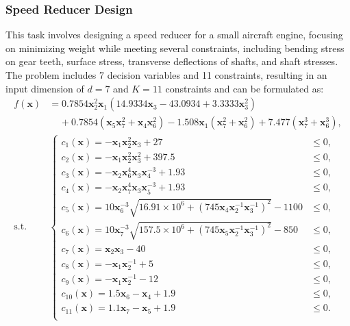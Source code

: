     
 \subsubsection{Speed Reducer Design}
\label{section:neural-cbo_speed}
This task involves designing a speed reducer for a small aircraft engine, focusing on minimizing weight while meeting several constraints, including bending stress on gear teeth, surface stress, transverse deflections of shafts, and shaft stresses. The problem includes 7 decision variables and 11 constraints, resulting in an input dimension of $d=7$ and $K=11$ constraints and can be formulated as:
\begin{align*}
    f(\mathbf{x}) &= 0.7854\mathbf{x}_2
^2 \mathbf{x}_1(14.9334\mathbf{x}_3 - 43.0934 + 3.3333\mathbf{x}_3^2) 
\\
    & \;\;\;\; +0.7854(\mathbf{x}_5\mathbf{x}_7^2 + \mathbf{x}_4\mathbf{x}_6^2) - 1.508\mathbf{x}_1(\mathbf{x}_7^2 + \mathbf{x}_6^2) + 7.477(\mathbf{x}_7^3 + \mathbf{x}_6^3), 
    \\
    \text{s.t. } & \begin{cases} 
    c_1(\mathbf{x}) = -\mathbf{x}_1\mathbf{x}_2^2\mathbf{x}_3 + 27  & \le 0, 
    \\
    c_2(\mathbf{x}) = -\mathbf{x}_1\mathbf{x}_2^2\mathbf{x}_3^2 + 397.5 & \le 0, 
    \\
    c_3(\mathbf{x}) = -\mathbf{x}_2\mathbf{x}_6^4
    \mathbf{x}_3\mathbf{x}_4^{-3}+ 1.93 &\le 0, 
    \\
    c_4(\mathbf{x}) = -\mathbf{x}_2\mathbf{x}_7^4
    \mathbf{x}_3\mathbf{x}_5^{-3}+ 1.93 & \le 0, 
    \\
    c_5(\mathbf{x}) = 10\mathbf{x}_6^{-3} \sqrt{16.91 \times 10^6 + (745\mathbf{x}_4\mathbf{x}_2^{-1}
    \mathbf{x}_3^{-1}
    )^2} -1100 & \le 0,
    \\
    c_6(\mathbf{x}) = 10\mathbf{x}_7^{-3} \sqrt{157.5 \times 10^6 + (745\mathbf{x}_5\mathbf{x}_2^{-1}
    \mathbf{x}_3^{-1}
    )^2} - 850 & \le 0,
    \\
    c_7(\mathbf{x}) = \mathbf{x}_2\mathbf{x}_3 -40 & \le 0,
    \\
    c_8(\mathbf{x}) = -\mathbf{x}_1 \mathbf{x}_2^{-1} + 5 & \le 0,
    \\
    c_9(\mathbf{x}) = -\mathbf{x}_1 \mathbf{x}_2^{-1} - 12  & \le 0,
    \\
    c_{10}(\mathbf{x}) = 1.5\mathbf{x}_6 - \mathbf{x}_4  + 1.9  & \le 0,
    \\
    c_{11}(\mathbf{x}) = 1.1\mathbf{x}_7 - \mathbf{x}_5  + 1.9  & \le 0.
    \\
    \end{cases}
\end{align*}

